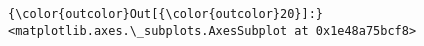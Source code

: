 \documentclass[11pt]{article}
\begin{document}
\begin{Verbatim}[commandchars=\\\{\}]
{\color{outcolor}Out[{\color{outcolor}20}]:} <matplotlib.axes.\_subplots.AxesSubplot at 0x1e48a75bcf8>
\end{Verbatim}
            
    \begin{center}
    \end{center}
    { \hspace*{\fill} \\}
    

    
    
    
    
\end{document}
